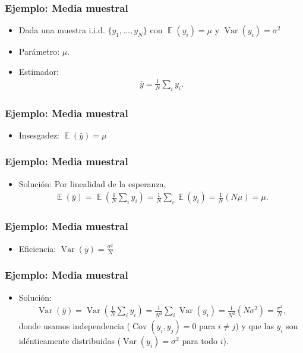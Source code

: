 \documentclass[t, compress, spanish, aspectratio=169]{beamer}
\DeclareMathOperator{\Var}{Var}
\DeclareMathOperator{\Cov}{Cov}
\DeclareMathOperator{\E}{\mathbb{E}}
\newcommand{\term}[1]{\structure{\textbf{#1}}} %
\begin{document}
	\begin{frame}
		\frametitle{Ejemplo: Media muestral}
		\begin{itemize}
			\item Dada una muestra i.i.d. $\{y_1,...,y_N\}$ con $\E(y_i)=\mu$ y $\Var(y_i)=\sigma^2$
			\item Par\'ametro: $\mu$.
			\item Estimador: \term{media muestral}
			\begin{align*}
			\bar y = \frac{1}{N} \sum_i y_i.
			\end{align*}
		\end{itemize}
	\end{frame}

	\begin{frame}
		\frametitle{Ejemplo: Media muestral}
		\begin{itemize}
			\item Insesgadez: $\E(\bar y)=\mu$
		\end{itemize}
	\end{frame}

	\begin{frame}
		\frametitle{Ejemplo: Media muestral}
		\begin{itemize}
			\item [] Soluci\'on: Por linealidad de la esperanza,
			\begin{align*}
			\E(\bar y) = \E\left(\frac{1}{N}\sum_i y_i\right) = \frac{1}{N}\sum_i \E(y_i) = \frac{1}{N}(N\mu) = \mu.
			\end{align*}
		\end{itemize}
	\end{frame}

	\begin{frame}
		\frametitle{Ejemplo: Media muestral}
		\begin{itemize}
			\item Eficiencia: $\Var(\bar y)=\frac{\sigma^2}{N}$
		\end{itemize}
	\end{frame}

	\begin{frame}
		\frametitle{Ejemplo: Media muestral}
		\begin{itemize}
			\item [] Soluci\'on:
			\begin{align*}
			\Var(\bar y) = \Var\left(\frac{1}{N}\sum_i y_i\right) = \frac{1}{N^2}\sum_i \Var(y_i) = \frac{1}{N^2}(N\sigma^2) = \frac{\sigma^2}{N},
			\end{align*}
			donde usamos independencia ($\Cov(y_i,y_j)=0$ para $i\neq j$) y que las $y_i$ son id\'enticamente distribuidas ($\Var(y_i)=\sigma^2$ para todo $i$).
		\end{itemize}
	\end{frame}
\end{document}

